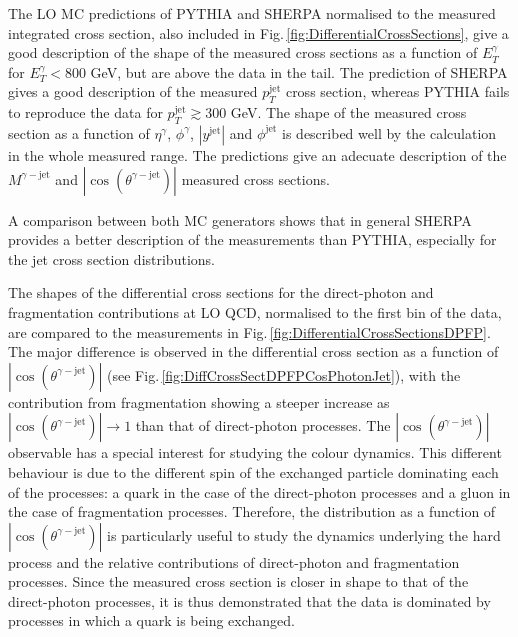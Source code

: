 \documentclass[12pt, twoside]{article}
\numberwithin{equation}{section}
\numberwithin{figure}{section}
\begin{document}
The LO MC predictions of PYTHIA and SHERPA normalised to the measured integrated cross section, also included in Fig.\,\ref{fig:DifferentialCrossSections}, give a good description of the shape of the measured cross sections as a function of $E^{\gamma}_{T}$ for $E^{\gamma}_{T} < 800$ GeV, but are above the data in the tail. The prediction of SHERPA gives a good description of the measured $p^{\text{jet}}_{T}$ cross section, whereas PYTHIA fails to reproduce the data for $p^{\text{jet}}_{T} \gtrsim 300$ GeV. The shape of the measured cross section as a function of $\eta^{\gamma}$, $\phi^{\gamma}$, $\left| y^{\text{jet}} \right|$ and $\phi^{\text{jet}}$ is described well by the calculation in the whole measured range. The predictions give an adecuate description of the $M^{\gamma-\text{jet}}$ and $\left| \cos \left( \theta^{\gamma-\text{jet}} \right) \right|$ measured cross sections.

A comparison between both MC generators shows that in general SHERPA provides a better description of the measurements than PYTHIA, especially for the jet cross section distributions.

The shapes of the differential cross sections for the direct-photon and fragmentation contributions at LO QCD, normalised to the first bin of the data, are compared to the measurements in Fig.\,\ref{fig:DifferentialCrossSectionsDPFP}. The major difference is observed in the differential cross section as a function of $\left| \cos \left( \theta^{\gamma-\text{jet}} \right) \right|$ (see Fig.\,\ref{fig:DiffCrossSectDPFPCosPhotonJet}), with the contribution from fragmentation showing a steeper increase as $\left| \cos \left( \theta^{\gamma-\text{jet}} \right) \right| \rightarrow 1$ than that of direct-photon processes. The $\left| \cos \left( \theta^{\gamma-\text{jet}} \right) \right|$ observable has a special interest for studying the colour dynamics. This different behaviour is due to the different spin of the exchanged particle dominating each of the processes: a quark in the case of the direct-photon processes and a gluon in the case of fragmentation processes. Therefore, the distribution as a function of $\left| \cos \left( \theta^{\gamma-\text{jet}} \right) \right|$ is particularly useful to study the dynamics underlying the hard process and the relative contributions of direct-photon and fragmentation processes. Since the measured cross section is closer in shape to that of the direct-photon processes, it is thus demonstrated that the data is dominated by processes in which a quark is being exchanged.
\end{document}
